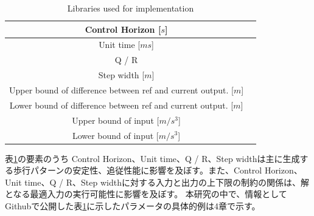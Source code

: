 \begin{table}[htbp]
  \centering
  \begin{tabular}{|c|c|} \hline
    Control Horizon  [$s$] \\ \hline
    Unit time  [$ms$] \\ \hline
    Q / R   \\ \hline
    Step width  [$m$] \\ \hline
    Upper bound of difference between ref and current output.  [$m$] \\ \hline
    Lower bound of difference between ref and current output.  [$m$] \\ \hline
    Upper bound of input  [$m/s^{3}$] \\ \hline
    Lower bound of input  [$m/s^{3}$] \\ \hline
  \end{tabular}
  \caption{Libraries used for implementation}
  \label{tb:parametor_list}
\end{table}

表\ref{tb:parametor_list}の要素のうち Control Horizon、Unit time、Q / R、Step widthは主に生成する歩行パターンの安定性、追従性能に影響を及ぼす。また、Control Horizon、Unit time、Q / R、Step widthに対する入力と出力の上下限の制約の関係は、解となる最適入力の実行可能性に影響を及ぼす。
本研究の中で、情報としてGithub\cite{MYGITHUB}で公開した表\ref{tb:parametor_list}に示したパラメータの具体的例は4章で示す。